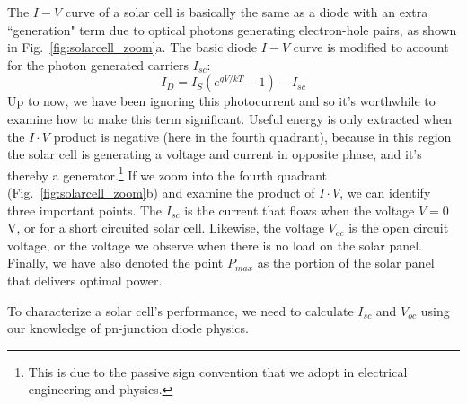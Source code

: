The $I-V$ curve of a solar cell is basically the same as a diode with an extra ``generation" term  due to optical photons generating electron-hole pairs, as shown in Fig.~\ref{fig:solarcell_zoom}a.  The basic diode $I-V$ curve is modified to account for the photon generated carriers $I_{sc}$:
\begin{equation} 
	I_D = I_S (e^{qV/kT} - 1) - I_{sc}
\end{equation}
Up to now, we have been ignoring this photocurrent and so it's worthwhile to examine how to make this term significant.  Useful energy is only extracted when the $I\cdot V$ product is negative (here in the fourth quadrant), because in this region the solar cell is generating a voltage and current in opposite phase, and it's thereby a generator.\footnote{This is due to the passive sign convention that we adopt in electrical engineering and physics.}  If we zoom into the fourth quadrant (Fig.~\ref{fig:solarcell_zoom}b) and examine the product of $I\cdot V$, we can identify three important points.  The $I_{sc}$ is the current that flows when the voltage $V = 0$V, or for a short circuited solar cell.  Likewise, the voltage $V_{oc}$ is the open circuit voltage, or the voltage we observe when there is no load on the solar panel.  Finally, we have also denoted the point $P_{max}$ as the portion of the solar panel that delivers optimal power.

To characterize a solar cell's performance, we need to calculate $I_{sc}$ and $V_{oc}$ using our knowledge of pn-junction diode physics.
